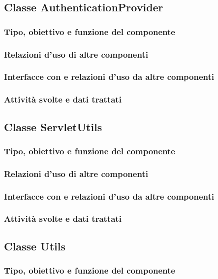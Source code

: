 \subsection{Classe AuthenticationProvider}
\subsubsection*{Tipo, obiettivo e funzione del componente}
\subsubsection*{Relazioni d'uso di altre componenti}
\subsubsection*{Interfacce con e relazioni d'uso da altre componenti}
\subsubsection*{Attivit\`a svolte e dati trattati}

\subsection{Classe ServletUtils}
\subsubsection*{Tipo, obiettivo e funzione del componente}
\subsubsection*{Relazioni d'uso di altre componenti}
\subsubsection*{Interfacce con e relazioni d'uso da altre componenti}
\subsubsection*{Attivit\`a svolte e dati trattati}

\subsection{Classe Utils}
\subsubsection*{Tipo, obiettivo e funzione del componente}
